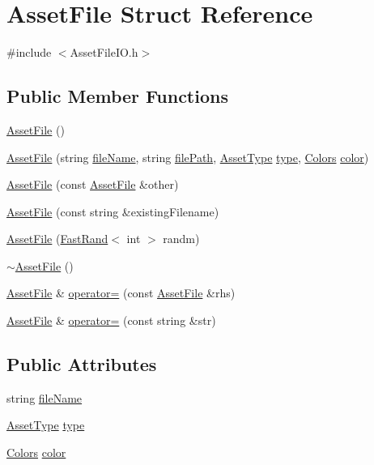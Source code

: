 \hypertarget{struct_asset_file}{\section{Asset\-File Struct Reference}
\label{struct_asset_file}
}


{\ttfamily \#include $<$Asset\-File\-I\-O.\-h$>$}

\subsection*{Public Member Functions}
\begin{DoxyCompactItemize}
\item 
\hyperlink{struct_asset_file_a138aff39a7ba0752bc64f917bde5cfe7}{Asset\-File} ()
\item 
\hyperlink{struct_asset_file_a80c0a491cfcf6ebfb5974d450a6cf3c7}{Asset\-File} (string \hyperlink{struct_asset_file_a6d2915fb2e781c162752036028bf9b32}{file\-Name}, string \hyperlink{struct_asset_file_a25c3567f452df062ea7dcee79c0aefde}{file\-Path}, \hyperlink{_asset_file_i_o_8h_a72d924d1cb8e1544b6d5198e98d52ca9}{Asset\-Type} \hyperlink{struct_asset_file_ad154debe8690c8bd1c29d091cabea4e7}{type}, \hyperlink{_character_data_8h_a55ecd4f2ec2ebfe8d5b0163e4ac2a967}{Colors} \hyperlink{struct_asset_file_a9665f3c7769b8cee2106d718de7c297c}{color})
\item 
\hyperlink{struct_asset_file_ac60659d896166a29083a443f38f1ef05}{Asset\-File} (const \hyperlink{struct_asset_file}{Asset\-File} \&other)
\item 
\hyperlink{struct_asset_file_add1d27fe2e94cda56bf6681ba5fd4ffc}{Asset\-File} (const string \&existing\-Filename)
\item 
\hyperlink{struct_asset_file_a7f4c4b962f0fe6fd880fcd22138ccde0}{Asset\-File} (\hyperlink{class_fast_rand}{Fast\-Rand}$<$ int $>$ randm)
\item 
\hyperlink{struct_asset_file_a067d33d121eef312ba85bd918dc4ac79}{$\sim$\-Asset\-File} ()
\item 
\hyperlink{struct_asset_file}{Asset\-File} \& \hyperlink{struct_asset_file_abc472db3c90c0db73f61da6df919c38b}{operator=} (const \hyperlink{struct_asset_file}{Asset\-File} \&rhs)
\item 
\hyperlink{struct_asset_file}{Asset\-File} \& \hyperlink{struct_asset_file_a58917e9118b1e2363ef69d174063fd02}{operator=} (const string \&str)
\end{DoxyCompactItemize}
\subsection*{Public Attributes}
\begin{DoxyCompactItemize}
\item 
string \hyperlink{struct_asset_file_a6d2915fb2e781c162752036028bf9b32}{file\-Name}
\item 
\hyperlink{_asset_file_i_o_8h_a72d924d1cb8e1544b6d5198e98d52ca9}{Asset\-Type} \hyperlink{struct_asset_file_ad154debe8690c8bd1c29d091cabea4e7}{type}
\item 
\hyperlink{_character_data_8h_a55ecd4f2ec2ebfe8d5b0163e4ac2a967}{Colors} \hyperlink{struct_asset_file_a9665f3c7769b8cee2106d718de7c297c}{color}
\end{DoxyCompactItemize}
